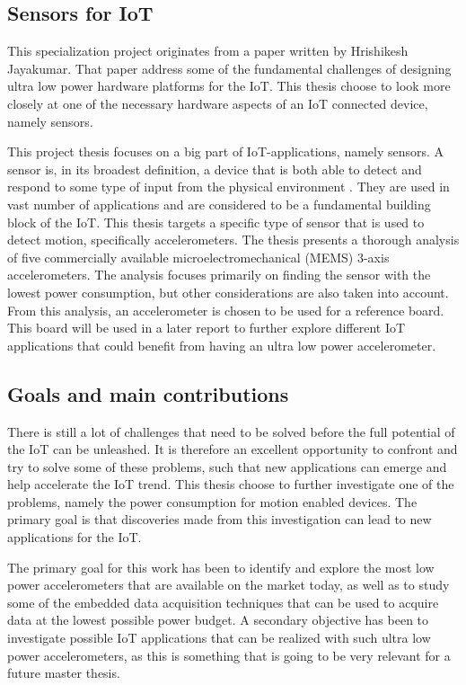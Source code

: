 \subsection{Sensors for IoT}

This specialization project originates from a paper written by Hrishikesh Jayakumar. That paper address some of the fundamental challenges of designing ultra low power hardware platforms for the IoT. This thesis choose to look more closely at one of the necessary hardware aspects of an IoT connected device, namely sensors.  

This project thesis focuses on a big part of IoT-applications, namely sensors. A sensor is, in its broadest definition, a device that is both able to detect and respond to some type of input from the physical environment \cite{wigmore12}. They are used in vast number of applications and are considered to be a fundamental building block of the IoT. This thesis targets a specific type of sensor that is used to detect motion, specifically accelerometers. The thesis presents a thorough analysis of five commercially available microelectromechanical (MEMS) 3-axis accelerometers. The analysis focuses primarily on finding the sensor with the lowest power consumption, but other considerations are also taken into account. From this analysis, an accelerometer is chosen to be used for a reference board. This board will be used in a later report to further explore different IoT applications that could benefit from having an ultra low power accelerometer.

\newpage

\subsection{Goals and main contributions}

There is still a lot of challenges that need to be solved before the full potential of the IoT can be unleashed. It is therefore an excellent opportunity to confront and try to solve some of these problems, such that new applications can emerge and help accelerate the IoT trend. This thesis choose to further investigate one of the problems, namely the power consumption for motion enabled devices. The primary goal is that discoveries made from this investigation can lead to new applications for the IoT. 

The primary goal for this work has been to identify and explore the most low power accelerometers that are available on the market today, as well as to study some of the embedded data acquisition techniques that can be used to acquire data at the lowest possible power budget. A secondary objective has been to investigate possible IoT applications that can be realized with such ultra low power accelerometers, as this is something that is going to be very relevant for a future master thesis.

